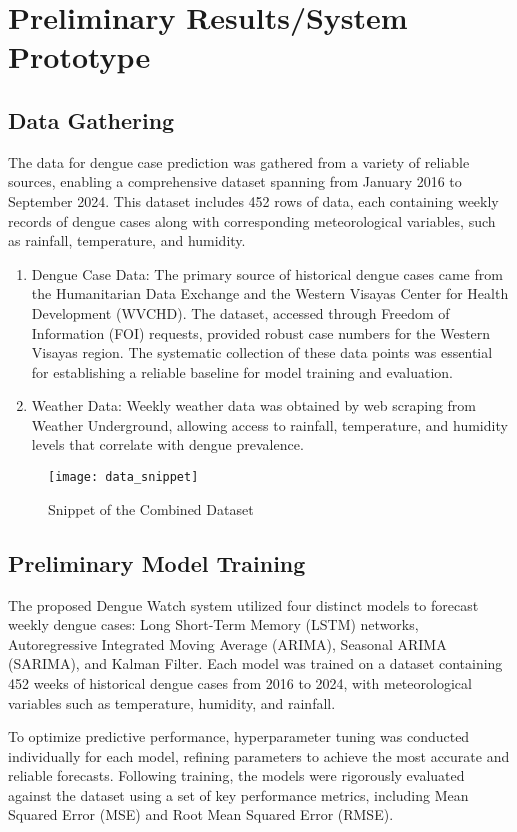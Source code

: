 \chapter{Preliminary Results/System Prototype}
\section{Data Gathering}
The data for dengue case prediction was gathered from a variety of reliable sources, enabling a comprehensive dataset spanning from January 2016 to September 2024. This dataset includes 452 rows of data, each containing weekly records of dengue cases along with corresponding meteorological variables, such as rainfall, temperature, and humidity.
\begin{enumerate}
	\item Dengue Case Data: The primary source of historical dengue cases came from the Humanitarian Data Exchange and the Western Visayas Center for Health Development (WVCHD). The dataset, accessed through Freedom of Information (FOI) requests, provided robust case numbers for the Western Visayas region. The systematic collection of these data points was essential for establishing a reliable baseline for model training and evaluation.
	\item Weather Data: Weekly weather data was obtained by web scraping from Weather Underground, allowing access to rainfall, temperature, and humidity levels that correlate with dengue prevalence.
\end{enumerate}

\begin{figure}[H]
	\centering
	\texttt{[image: data\_snippet]}
	\caption{Snippet of the Combined Dataset}
	\label{fig:data_snippet}
\end{figure}

\section{Preliminary Model Training}
The proposed Dengue Watch system utilized four distinct models to forecast weekly dengue cases: Long Short-Term Memory (LSTM) networks, Autoregressive Integrated Moving Average (ARIMA), Seasonal ARIMA (SARIMA), and Kalman Filter. Each model was trained on a dataset containing 452 weeks of historical dengue cases from 2016 to 2024, with meteorological variables such as temperature, humidity, and rainfall.

To optimize predictive performance, hyperparameter tuning was conducted individually for each model, refining parameters to achieve the most accurate and reliable forecasts. Following training, the models were rigorously evaluated against the dataset using a set of key performance metrics, including Mean Squared Error (MSE) and Root Mean Squared Error (RMSE).


